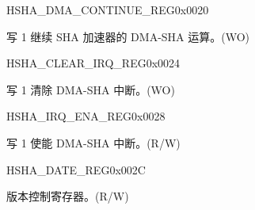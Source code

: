 \begin{register}{H}{SHA\_DMA\_CONTINUE\_REG}{0x0020}\label{regdesc:SHADMACONTINUEREG}
%
%
\regnewline%
\begin{regdesc}\begin{reglist}
\label{fielddesc:SHADMACONTINUE}\item [SHA\_DMA\_CONTINUE] 写 1 继续 SHA 加速器的 DMA-SHA 运算。(WO)
\end{reglist}\end{regdesc}
\end{register}


\begin{register}{H}{SHA\_CLEAR\_IRQ\_REG}{0x0024}\label{regdesc:SHACLEARIRQREG}
%
%
\regnewline%
\begin{regdesc}\begin{reglist}
\label{fielddesc:SHACLEARINTERRUPT}\item [SHA\_CLEAR\_INTERRUPT] 写 1 清除 DMA-SHA 中断。(WO)
\end{reglist}\end{regdesc}
\end{register}


\begin{register}{H}{SHA\_IRQ\_ENA\_REG}{0x0028}\label{regdesc:SHAIRQENAREG}
%
%
\regnewline%
\begin{regdesc}\begin{reglist}
\label{fielddesc:SHAINTERRUPTENA}\item [SHA\_INTERRUPT\_ENA] 写 1 使能 DMA-SHA 中断。(R/W)
\end{reglist}\end{regdesc}
\end{register}


\begin{register}{H}{SHA\_DATE\_REG}{0x002C}\label{regdesc:SHADATEREG}
%
%
\regnewline%
\begin{regdesc}\begin{reglist}
\label{fielddesc:SHADATE}\item [SHA\_DATE] 版本控制寄存器。(R/W)
\end{reglist}\end{regdesc}
\end{register}


